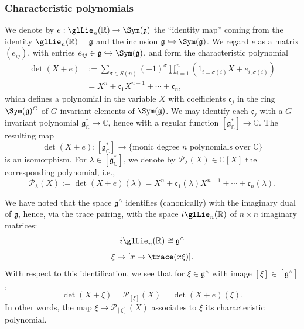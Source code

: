 \subsubsection{Characteristic polynomials}\label{sec:char-polyn}
We denote by $e : \glLie_n(\mathbb{R}) \rightarrow \Sym(\mathfrak{g})$ the ``identity map'' coming from the identity $\glLie_n(\mathbb{R}) = \mathfrak{g}$ and the inclusion $\mathfrak{g} \hookrightarrow \Sym(\mathfrak{g})$.  We regard $e$ as a matrix $(e_{i j})$, with entries $e_{i j} \in \mathfrak{g} \hookrightarrow \Sym(\mathfrak{g})$, and form the characteristic polynomial
\begin{align}\label{eq:detx-+-e}
  \det(X + e)
  &:=
    \sum_{\sigma \in S(n)}
    (-1)^\sigma
    \prod_{i=1}^n
    (1_{i=\sigma(i)} X
    + e_{i,\sigma(i)})
  \\ \nonumber
  &=
    X^n +
    \mathfrak{c}_1 X^{n-1}
    + \dotsb + \mathfrak{c}_n,
\end{align}
which defines a polynomial in the variable $X$ with coefficients $\mathfrak{c}_j$ in the ring $\Sym(\mathfrak{g})^G$ of $G$-invariant elements of $\Sym(\mathfrak{g})$.  We may identify each $\mathfrak{c}_j$ with a $G$-invariant polynomial $\mathfrak{g}_\mathbb{C}^* \rightarrow \mathbb{C}$, hence with a regular function $[\mathfrak{g}_\mathbb{C}^*] \rightarrow \mathbb{C}$.  The resulting map
\[
  \det(X + e) : [\mathfrak{g}_\mathbb{C}^*] \rightarrow \{ \text{monic degree $n$ polynomials over $\mathbb{C}$} \}
\]
is an isomorphism.  For $\lambda \in [\mathfrak{g}_{\mathbb{C}}^*]$, we denote by $\mathcal{P}_\lambda(X) \in \mathbb{C}[X]$ the corresponding polynomial, i.e., 
\begin{equation}\label{eq:polynomial-P-lambda}
  \mathcal{P}_\lambda(X) := \det(X+e)(\lambda) = X^n + \mathfrak{c}_1(\lambda) X^{n-1} + \dotsb + \mathfrak{c}_n(\lambda).
\end{equation}

We have noted that the space $\mathfrak{g}^\wedge$ identifies (canonically) with the imaginary dual of $\mathfrak{g}$,  hence, via the trace pairing, with the space $i \glLie_n(\mathbb{R})$ of $n \times n$ imaginary matrices:
\[
  i \glLie_n(\mathbb{R}) \cong \mathfrak{g}^\wedge
\]
\[
  \xi \mapsto [x \mapsto \trace(x \xi)].
\]
With respect to this identification, we see that for $\xi \in \mathfrak{g}^\wedge$ with image $[\xi] \in [\mathfrak{g}^\wedge]$,
\begin{equation}\label{eq:cui1fo922g}
  \det(X + \xi) = \mathcal{P}_{[\xi]}(X) = \det(X + e)(\xi).
\end{equation}
In other words, the map $\xi \mapsto \mathcal{P}_{[\xi]}(X)$ associates to $\xi$ its characteristic polynomial.

